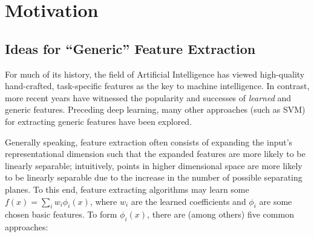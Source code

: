 \section{Motivation}\label{chp:motivation}

\subsection{Ideas for “Generic” Feature Extraction}\label{ssec:generic-feature-extraction}

For much of its history, the field of Artificial Intelligence has viewed high-quality hand-crafted, task-specific features as the key to machine intelligence.
In contrast, more recent years have witnessed the popularity and successes of \textit{learned} and generic features.
Preceding deep learning, many other approaches (such as SVM) for extracting generic features have been explored.

Generally speaking, feature extraction often consists of expanding the input's representational dimension such that the expanded features are more likely to be linearly separable; intuitively, points in higher dimensional space are more likely to be linearly separable due to the increase in the number of possible separating planes.
To this end, feature extracting algorithms may learn some $f(x)=\sum_i w_i \phi_i (x)$, where $w_i$ are the learned coefficients and $\phi_i$ are some chosen basic features.
To form $\phi_i (x)$, there are (among others) five common approaches:


